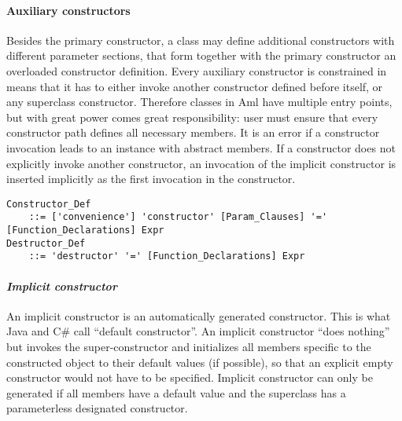 \paragraph{Auxiliary constructors}
Besides the primary constructor, a class may define additional constructors with different parameter sections, that form together with the primary constructor an overloaded constructor definition. Every auxiliary constructor is constrained in means that it has to either invoke another constructor defined before itself, or any superclass constructor. Therefore classes in Aml have multiple entry points, but with great power comes great responsibility: user must ensure that every constructor path defines all necessary members. It is an error if a constructor invocation leads to an instance with abstract members. If a constructor does not explicitly invoke another constructor, an invocation of the implicit constructor is inserted implicitly as the first invocation in the constructor. 

\grammar\begin{lstlisting}
Constructor_Def
    ::= ['convenience'] 'constructor' [Param_Clauses] '=' [Function_Declarations] Expr
Destructor_Def 
    ::= 'destructor' '=' [Function_Declarations] Expr
\end{lstlisting}

\paragraph{\em Implicit constructor}
An implicit constructor is an automatically generated constructor. This is what Java and C\# call ``default constructor''. An implicit constructor ``does nothing'' but invokes the super-constructor and initializes all members specific to the constructed object to their default values (if possible), so that an explicit empty constructor would not have to be specified. Implicit constructor can only be generated if all members have a default value and the superclass has a parameterless designated constructor. 

